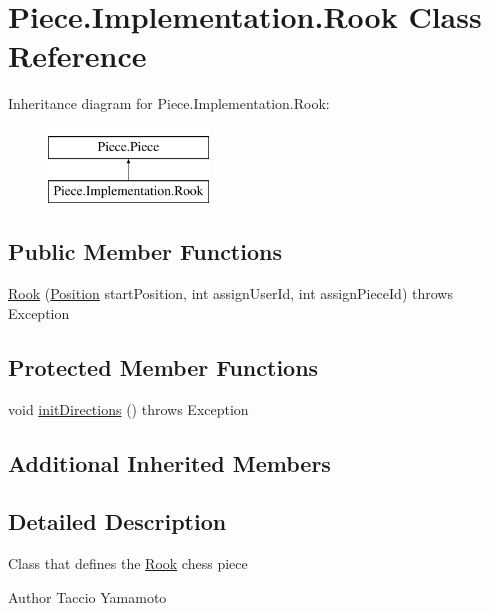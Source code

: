 \hypertarget{classPiece_1_1Implementation_1_1Rook}{\section{Piece.\-Implementation.\-Rook Class Reference}
\label{classPiece_1_1Implementation_1_1Rook}
}
Inheritance diagram for Piece.\-Implementation.\-Rook\-:\begin{figure}[H]
\begin{center}
\leavevmode
\includegraphics[height=2.000000cm]{classPiece_1_1Implementation_1_1Rook}
\end{center}
\end{figure}
\subsection*{Public Member Functions}
\begin{DoxyCompactItemize}
\item 
\hyperlink{classPiece_1_1Implementation_1_1Rook_a6d1df9c5b8b533c2591225a9e36b1292}{Rook} (\hyperlink{classUtil_1_1Position}{Position} start\-Position, int assign\-User\-Id, int assign\-Piece\-Id)  throws Exception
\end{DoxyCompactItemize}
\subsection*{Protected Member Functions}
\begin{DoxyCompactItemize}
\item 
void \hyperlink{classPiece_1_1Implementation_1_1Rook_a0288b5ea743dcb4286fb0c91bd163f0d}{init\-Directions} ()  throws Exception
\end{DoxyCompactItemize}
\subsection*{Additional Inherited Members}


\subsection{Detailed Description}
Class that defines the \hyperlink{classPiece_1_1Implementation_1_1Rook}{Rook} chess piece \begin{DoxyAuthor}{Author}
Taccio Yamamoto 
\end{DoxyAuthor}


